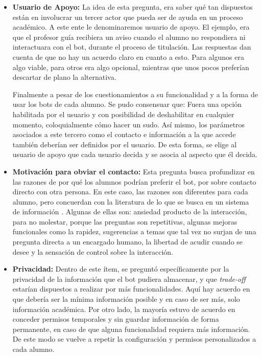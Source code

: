 \begin{itemize}
        \item \textbf{Usuario de Apoyo:} La idea de esta pregunta, era saber qué tan dispuestos están en involucrar un tercer actor que pueda ser de ayuda en un proceso académico.  A este ente le denominaremos usuario de apoyo. El ejemplo, era que el profesor guía recibiera un aviso cuando el alumno no respondiera ni interactuara con el bot, durante el proceso de titulación. Las respuestas dan cuenta de que no hay un acuerdo claro en cuanto a esto. Para algunos era algo viable, para otros era algo opcional, mientras que unos pocos preferían descartar de plano la alternativa.
        \par Finalmente a pesar de los cuestionamientos a su funcionalidad y a la forma de usar los bots de cada alumno. Se pudo consensuar que: Fuera una opción habilitada por el usuario y con posibilidad de deshabilitar en cualquier momento, coloquialmente \guillemotleft cómo hacer un sudo\guillemotright. Así mismo, los parámetros asociados a este tercero como el contacto e información a la que accede también deberían ser definidos por el usuario. De esta forma, se elige al usuario de apoyo que cada usuario decida y se asocia al aspecto que él decida.

        \item \textbf{Motivación para obviar el contacto:} Esta pregunta busca profundizar en las razones de por qué los alumnos podrían preferir el bot, por sobre contacto directo con otra persona. En este caso, las razones son diferentes para cada alumno, pero concuerdan con la literatura de lo que se busca en un sistema de información \cite{Thurman}. Algunas de ellas son: ansiedad producto de la interacción, para no molestar, porque las preguntas son repetitivas, algunas mejoras funcionales como la rapidez, sugerencias a temas que tal vez no surjan de una pregunta directa a un encargado humano, la libertad de acudir cuando se desee y la sensación de control sobre la interacción.
        
        \item \textbf{Privacidad:} Dentro de este ítem, se preguntó específicamente por la privacidad de la información que el bot pudiera almacenar, y que \textit{trade-off} estarían dispuestos a realizar por más funcionalidades. Aquí hay acuerdo en que debería ser la mínima información posible y en caso de ser más, solo información académica. Por otro lado, la mayoría estuvo de acuerdo en conceder permisos temporales y sin guardar información de forma permanente, en caso de que alguna funcionalidad requiera más información. De este modo se vuelve a repetir la configuración y permisos personalizados a cada alumno.
        

\end{itemize}
